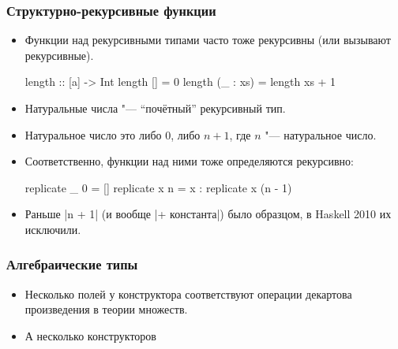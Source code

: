 \documentclass[10pt]{beamer}
\begin{document}
\begin{frame}[fragile]
  \frametitle{Структурно-рекурсивные функции}
  \begin{itemize}
    \item Функции над рекурсивными типами часто тоже рекурсивны (или вызывают рекурсивные).
          \begin{haskell}
            length :: [a] -> Int
            length [] = 0
            length (_ : xs) = length xs + 1
          \end{haskell}
    \item Натуральные числа "--- \enquote{почётный} рекурсивный тип.
          \pause
    \item Натуральное число это либо $0$, либо $n + 1$, где $n$ "--- натуральное число.
    \item Соответственно, функции над ними тоже определяются рекурсивно:
          \begin{haskell}
            replicate _ 0 = []
            replicate x n = x : replicate x (n - 1)
          \end{haskell}
    \item Раньше \haskinline|n + 1| (и вообще \haskinline|+ константа|) было образцом, в Haskell 2010 их исключили.
  \end{itemize}
\end{frame}

\begin{frame}[fragile]
  \frametitle{Алгебраические типы}
  \begin{itemize}
    \item Несколько полей у конструктора соответствуют операции декартова произведения в теории множеств.
    \item А несколько конструкторов
  \end{itemize}
\end{frame}
\end{document}
